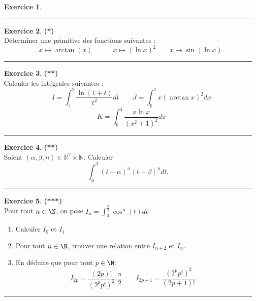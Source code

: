 \documentclass[a4paper,11pt]{article}
\theoremstyle{definition}
\newtheorem{exo}{Exercice} %
\begin{document}
\begin{minipage}{1\linewidth}
\begin{minipage}[t]{0.48\linewidth}
\begin{exo}
	\centering
	\rule{1\linewidth}{0.6pt}
\end{exo}

\begin{exo}\textbf{(*)}\quad\\[0.1cm]
	Déterminer une primitive des fonctions suivantes :
	$$\quad x\mapsto\arctan(x)\quad\quad\quad x\mapsto (\ln x)^2\quad\quad x\mapsto \sin(\ln x).$$
	
	\centering
	\rule{1\linewidth}{0.6pt}
\end{exo}


\begin{exo}\textbf{(**)}\quad\\[0.1cm]
	Calculer les intégrales suivantes :
	$$\quad I=\int_1^2\frac{\ln(1+t)}{t^2}dt\quad \quad J=\int_0^1 x(\arctan x)^2dx$$ $$\quad K=\int_0^1 \frac{x\ln x}{(x^2+1)^2}dx$$
	

	
	
	\centering
	\rule{1\linewidth}{0.6pt}
\end{exo}

\begin{exo}\textbf{(**)}\quad\\[0.1cm]

	Soient $(\alpha,\beta,n)\in\mathbb R^2\times\mathbb N$. Calculer
	$$\int_\alpha^\beta(t-\alpha)^n (t-\beta)^n dt.$$
	
	
	
	\centering
	\rule{1\linewidth}{0.6pt}
\end{exo}


\begin{exo}\textbf{(***)}\quad\\[0.1cm]
	Pour tout $n \in \N$, on pose $I_n =\int_{0}^{\frac{\pi}{2}}
	\cos^n(t) dt$.
	\begin{enumerate}
		\item Calculer $I_0$ et $I_1$
		\item Pour tout $n\in \N$, trouver une relation entre $I_{n+2}$ et $I_n$.
		\item En déduire que pour tout $p\in\N$:
		$$I_{2p}= \dfrac{(2p)!}{(2^pp!)^2} . \dfrac{\pi}{2}\quad \quad I_{2p+1}= \dfrac{(2^pp!)^2}{(2p+1)!}. $$
	\end{enumerate}
	
	
	\centering
	\rule{1\linewidth}{0.6pt}
\end{exo}


\end{minipage}
\end{minipage}
\end{document}
